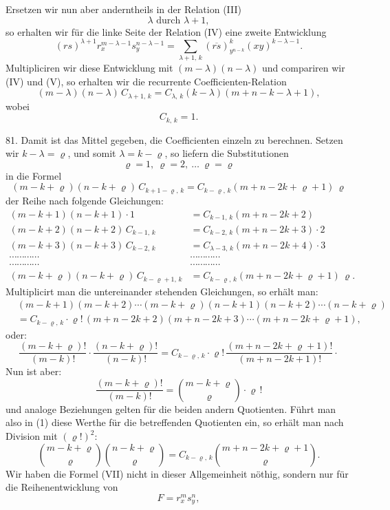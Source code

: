 \documentclass[11pt]{article}
\providecommand{\weberpage}[1]{}
\providecommand{\weq}[2]{\begin{equation}\tag{#1}#2\end{equation}}
\begin{document}
\weberpage{85}
Ersetzen wir nun aber anderntheils in der Relation (III)
\[
\lambda \text{ durch } \lambda + 1,
\]
so erhalten wir für die linke Seite der Relation (IV) eine zweite Entwicklung
\weq{V}{(rs)^{\lambda+1} r_x^{m-\lambda-1} s_y^{n-\lambda-1} = \sum_{\lambda+1,\,k} (\overline{rs})^k_{y^{n-k}} (xy)^{k-\lambda-1}.}
Multipliciren wir diese Entwicklung mit $(m-\lambda)(n-\lambda)$ und compariren wir (IV) und (V), so erhalten wir die recurrente Coefficienten-Relation
\weq{VI}{(m-\lambda)(n-\lambda)\,C_{\lambda+1,\,k}=C_{\lambda,\,k}(k-\lambda)(m+n-k-\lambda+1),}
wobei
\[
C_{k,\,k}=1.
\]

81. Damit ist das Mittel gegeben, die Coefficienten einzeln zu berechnen. Setzen wir $k-\lambda=\varrho$, und somit $\lambda=k-\varrho$, so liefern die Substitutionen
\[
\varrho=1,\ \varrho=2,\ \dots\ \varrho=\varrho
\]
in die Formel
\[
(m-k+\varrho)(n-k+\varrho)\,C_{k+1-\varrho,\,k}=C_{k-\varrho,\,k}(m+n-2k+\varrho+1)\,\varrho
\]
der Reihe nach folgende Gleichungen:
\begin{align*}
(m-k+1)(n-k+1)\cdot 1 &= C_{k-1,\,k}(m+n-2k+2)\\
(m-k+2)(n-k+2)\,C_{k-1,\,k} &= C_{k-2,\,k}(m+n-2k+3)\cdot 2\\
(m-k+3)(n-k+3)\,C_{k-2,\,k} &= C_{\lambda-3,\,k}(m+n-2k+4)\cdot 3 %
\\
\cdots\cdots\cdots\cdots &\cdots\cdots\cdots\cdots\\
\cdots\cdots\cdots\cdots &\cdots\cdots\cdots\cdots\\
(m-k+\varrho)(n-k+\varrho)\,C_{k-\varrho+1,\,k} &= C_{k-\varrho,\,k}(m+n-2k+\varrho+1)\,\varrho.
\end{align*}
Multiplicirt man die untereinander stehenden Gleichungen, so erhält man:
\begin{align*}
&(m-k+1)(m-k+2)\cdots(m-k+\varrho)(n-k+1)(n-k+2)\cdots(n-k+\varrho)\\
&= C_{k-\varrho,\,k}\cdot \varrho!\,(m+n-2k+2)(m+n-2k+3)\cdots(m+n-2k+\varrho+1),
\end{align*}
oder:
\weq{1}{\frac{(m-k+\varrho)!}{(m-k)!}\cdot\frac{(n-k+\varrho)!}{(n-k)!}=C_{k-\varrho,\,k}\cdot \varrho!\,\frac{(m+n-2k+\varrho+1)!}{(m+n-2k+1)!}\cdot}
Nun ist aber:
\[
\frac{(m-k+\varrho)!}{(m-k)!}=\binom{m-k+\varrho}{\varrho}\cdot \varrho\,!
\]
und analoge Beziehungen gelten für die beiden andern Quotienten. Führt man also in (1) diese Werthe für die betreffenden Quotienten ein, so erhält man nach Division mit $(\varrho!)^2$:
\weq{VII}{\binom{m-k+\varrho}{\varrho}\binom{n-k+\varrho}{\varrho}=C_{k-\varrho,\,k}\binom{m+n-2k+\varrho+1}{\varrho}.}
Wir haben die Formel (VII) nicht in dieser Allgemeinheit nöthig, sondern nur für die Reihenentwicklung von
\[
F=r_x^m s_y^n,
\]
\end{document}
